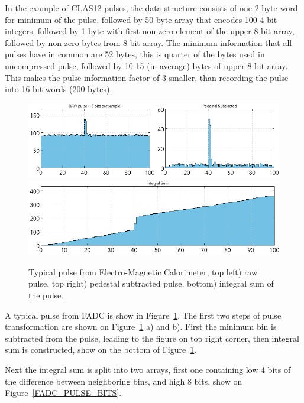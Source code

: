 \documentclass[12pt]{article}
\begin{document}
In the example of CLAS12 pulses, the data structure consists of one 2 byte word for
minimum of the pulse, followed by 50 byte array that encodes 100 4 bit integers, followed
by 1 byte with first non-zero element of the upper 8 bit array, followed by non-zero bytes
from 8 bit array. The minimum information that all pulses have in common are 52 bytes,
this is quarter of the bytes used in uncompressed pulse, followed by 10-15 (in average)
bytes of upper 8 bit array. This makes the pulse information factor of 3 smaller, than 
recording the pulse into 16 bit words (200 bytes).



\begin{figure}[!ht]
\begin{center}

 \includegraphics[width=5in]{pics/fadc_pulse_reduction.png}
 \includegraphics[width=5in]{pics/fadc_pulse_summ.png}

 \caption {Typical pulse from Electro-Magnetic Calorimeter, top left) raw pulse, top right) pedestal subtracted pulse, bottom) integral sum of the pulse.}
 \label{FADC_PULSE}
 \end{center}
\end{figure}

A typical pulse from FADC is show in Figure~\ref{FADC_PULSE}. The first two steps of
pulse transformation are shown on Figure~\ref{FADC_PULSE} a) and b). First the minimum
bin is subtracted from the pulse, leading to the figure on top right corner, then integral sum
is constructed, show on the bottom of Figure~\ref{FADC_PULSE}.

Next the integral sum is split into two arrays, first one containing low 4 bits of the
difference between neighboring bins, and high 8 bits, show on Figure~\ref{FADC_PULSE_BITS}.
\end{document}
